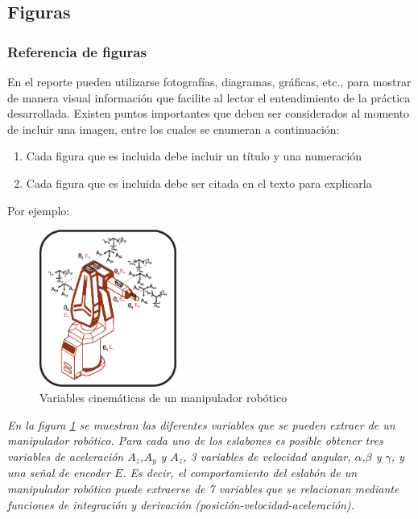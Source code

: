 \subsection{Figuras}

\subsubsection{Referencia de figuras}

En el reporte pueden utilizarse fotografías, diagramas, gráficas, etc., para mostrar de manera visual información que facilite al lector el entendimiento de la práctica desarrollada. Existen
puntos importantes que deben ser considerados al momento de incluir una imagen, entre los cuales
se enumeran a continuación:

\begin{enumerate}
\item Cada figura que es incluida debe incluir un título y una numeración
\item Cada figura que es incluida debe ser citada en el texto para explicarla
\end{enumerate}

Por ejemplo:

\begin{figure}[!htbp]
        \centering
        \includegraphics[width=0.4\textwidth]{images/robot.eps}
        \caption{\footnotesize{Variables cinemáticas de un manipulador robótico}}
        \label{fig1_100}
\end{figure}

\emph{
En la figura \ref{fig1_100} se muestran las diferentes variables que se pueden extraer de un manipulador robótico. Para cada uno de los eslabones es posible obtener tres variables de aceleración $A_z$,$A_y$ y $A_z$, 3 variables de velocidad angular, $\alpha$,$\beta$ y $\gamma$,  y una señal de encoder $E$. Es decir, el comportamiento
del eslabón de un manipulador robótico puede extraerse de  7 variables que se relacionan mediante
funciones de integración y derivación (posición-velocidad-aceleración).
}

